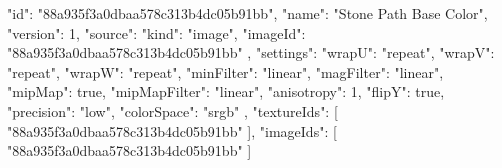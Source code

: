 {
  "id": "88a935f3a0dbaa578c313b4dc05b91bb",
  "name": "Stone Path Base Color",
  "version": 1,
  "source": {
    "kind": "image",
    "imageId": "88a935f3a0dbaa578c313b4dc05b91bb"
  },
  "settings": {
    "wrapU": "repeat",
    "wrapV": "repeat",
    "wrapW": "repeat",
    "minFilter": "linear",
    "magFilter": "linear",
    "mipMap": true,
    "mipMapFilter": "linear",
    "anisotropy": 1,
    "flipY": true,
    "precision": "low",
    "colorSpace": "srgb"
  },
  "textureIds": [
    "88a935f3a0dbaa578c313b4dc05b91bb"
  ],
  "imageIds": [
    "88a935f3a0dbaa578c313b4dc05b91bb"
  ]
}
